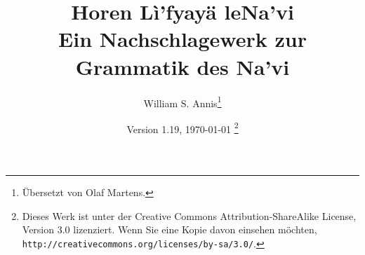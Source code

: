 \documentclass[12pt,oneside]{book}
\begin{document}
\frenchspacing

\title{Horen L\`i’fyay\"a leNa’vi\\Ein Nachschlagewerk zur Grammatik des Na’vi}
\author{William S. Annis\footnote{\"Ubersetzt von Olaf Martens.}}
\date{Version 1.19, \today
    \footnote{Dieses Werk ist unter der Creative Commons 
    Attribution-ShareAlike License, Version 3.0 lizenziert.
    Wenn Sie eine Kopie davon einsehen m\"ochten,
    \texttt{http://creativecommons.org/licenses/by-sa/3.0/}.}}
\maketitle

\setcounter{tocdepth}{2}
\begin{multicols}{2}
\tableofcontents
\end{multicols}









\appendix
{\small \printindex}


\end{document}
